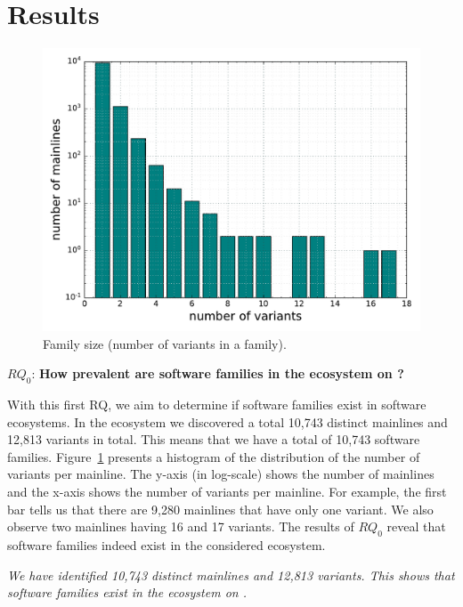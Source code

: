 \section{Results}
\label{sec:results}
\begin{figure}[htbp]
\vspace{-.3cm}
   \centering
    \includegraphics[scale=0.4]{figures/variants.pdf}
    \caption{Family size (number of variants in a family).}
   
    \label{fig:variants}
\end{figure}

\noindent
$RQ_0$: \textbf{How prevalent are software families in the \js ecosystem on \gh?}

With this first RQ, we aim to determine if software families exist in software ecosystems. In the \js ecosystem we discovered a total 10,743 distinct mainlines and 12,813 variants in total. This means that we have a total of 10,743 software families. Figure~\ref{fig:variants} presents a histogram of the distribution of the number of variants per mainline. The y-axis (in log-scale) shows the number of mainlines and  the x-axis shows the number of variants per mainline. For example, the first bar tells us that there are 9,280 mainlines that have only one variant. We also observe two mainlines having 16 and 17 variants. The results of $RQ_0$ reveal that software families indeed exist in the considered ecosystem.%

\begin{framed}
\noindent
\emph{We have identified 10,743 distinct mainlines and 12,813 variants. This shows that software families exist in the \js ecosystem on \gh.}
\end{framed}

